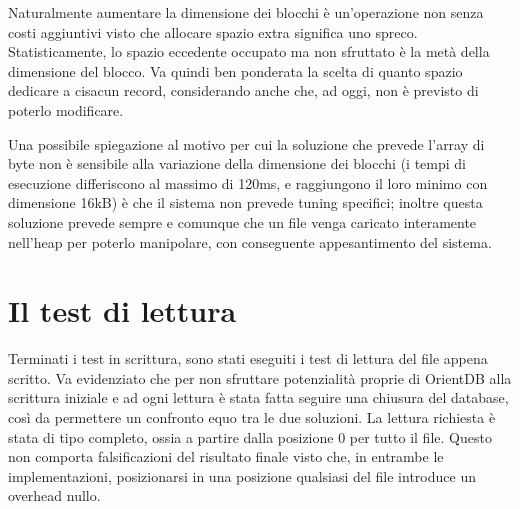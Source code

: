Naturalmente aumentare la dimensione dei blocchi è un'operazione non senza costi aggiuntivi visto che allocare spazio extra significa uno spreco. Statisticamente, lo spazio eccedente occupato ma non sfruttato è la metà della dimensione del blocco. Va quindi ben ponderata la scelta di quanto spazio dedicare a cisacun record, considerando anche che, ad oggi, non è previsto di poterlo modificare.

Una possibile spiegazione al motivo per cui la soluzione che prevede l'array di byte non è sensibile alla variazione della dimensione dei blocchi (i tempi di esecuzione differiscono al massimo di 120ms, e raggiungono il loro minimo con dimensione 16kB) è che il sistema non prevede tuning specifici; inoltre questa soluzione prevede sempre e comunque che un file venga caricato interamente nell'heap per poterlo manipolare, con conseguente appesantimento del sistema.

\section{Il test di lettura}
Terminati i test in scrittura, sono stati eseguiti i test di lettura del file appena scritto. Va evidenziato che per non sfruttare potenzialità proprie di OrientDB alla scrittura iniziale e ad ogni lettura è stata fatta seguire una chiusura del database, così da permettere un confronto equo tra le due soluzioni. La lettura richiesta è stata di tipo completo, ossia a partire dalla posizione 0 per tutto il file. Questo non comporta falsificazioni del risultato finale visto che, in entrambe le implementazioni, posizionarsi in una posizione qualsiasi del file introduce un overhead nullo.

